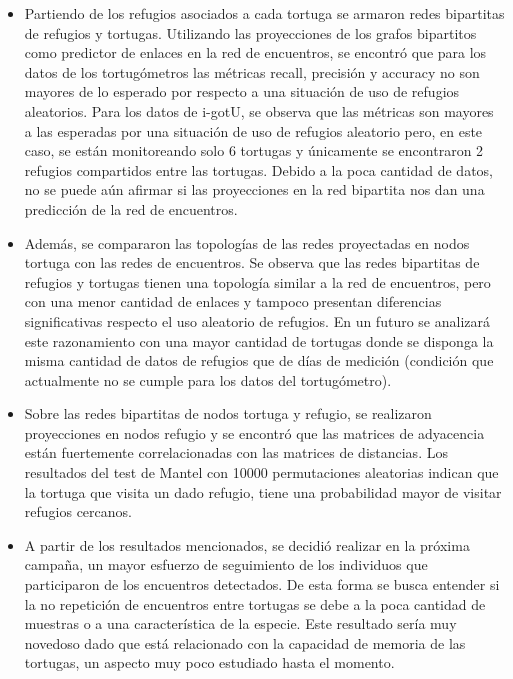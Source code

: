 \begin{itemize}
\item Partiendo de los refugios asociados a cada tortuga se armaron redes bipartitas de refugios y tortugas. Utilizando las proyecciones de los grafos bipartitos como predictor de enlaces en la red de encuentros, se encontró que para los datos de los tortugómetros las métricas recall, precisión y accuracy no son mayores de lo esperado por respecto a una situación de uso de refugios aleatorios. Para los datos de i-gotU, se observa que las métricas son mayores a las esperadas por  una situación de uso de refugios aleatorio pero, en este caso, se están monitoreando solo 6 tortugas y únicamente se encontraron 2 refugios compartidos entre las tortugas. Debido a la poca cantidad de datos, no se puede aún afirmar si las proyecciones en la red bipartita nos dan una predicción de la red de encuentros.
 
\item Además, se compararon las topologías de las redes proyectadas en nodos tortuga con las redes de encuentros. Se observa que las redes bipartitas de refugios y tortugas tienen una topología similar a la red de encuentros, pero con una menor cantidad de enlaces y tampoco presentan diferencias significativas respecto el uso aleatorio de refugios.  En un futuro se analizará este razonamiento con una mayor cantidad de tortugas donde se disponga la misma cantidad de datos de refugios que de días de medición (condición que actualmente no se cumple para los datos del tortugómetro).
 
\item Sobre las redes bipartitas de nodos tortuga y refugio, se realizaron proyecciones en nodos refugio y se encontró que las matrices de adyacencia están fuertemente correlacionadas con las matrices de distancias. Los resultados del test de Mantel con 10000 permutaciones aleatorias indican que la tortuga que visita un dado refugio, tiene una probabilidad mayor de visitar refugios cercanos.
 
\item{A partir de los resultados mencionados, se decidió realizar en la próxima campaña, un mayor esfuerzo de seguimiento de los individuos que participaron de los encuentros  detectados. De esta forma se busca entender si la no repetición de encuentros entre tortugas se debe a la poca cantidad de muestras o a una característica de la especie. Este resultado sería muy novedoso dado que está relacionado con la capacidad de memoria de las tortugas, un aspecto muy poco estudiado hasta el momento.} 

\end{itemize}
 
